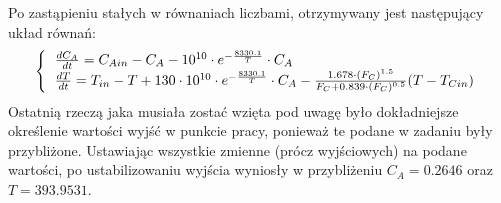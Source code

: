 Po zastąpieniu stałych w równaniach liczbami, otrzymywany jest następujący układ równań:\\
\begin{equation}
	\left\{
	\begin{tabular}{l}
	$\frac{dC_A}{dt} = C_{Ain} - C_A - 10^{10}\cdot e^{-\frac{8330.1}{T}}\cdot C_A$\\
	$\frac{dT}{dt} = T_{in} - T + 130\cdot 10^{10}\cdot e^{-\frac{8330.1}{T}}\cdot C_A-\frac{1.678\cdot (F_C)^{1.5}}{F_C+0.839\cdot (F_C)^{0.5}}(T-T_{Cin})$
	\end{tabular}
	\right.
\end{equation}
Ostatnią rzeczą jaka musiała zostać wzięta pod uwagę było dokładniejsze określenie wartości wyjść w punkcie pracy, ponieważ te podane w zadaniu były przybliżone. Ustawiając wszystkie zmienne (prócz wyjściowych) na podane wartości, po ustabilizowaniu wyjścia wyniosły w przybliżeniu $C_A = 0.2646$ oraz $T = 393.9531$.